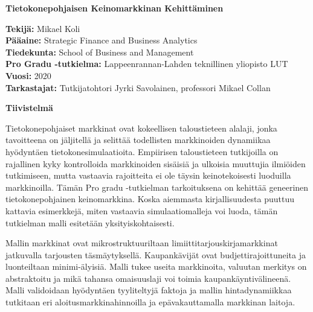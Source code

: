 

\thispagestyle{plain}
\begin{center}
    \Large
    \textbf{Tietokonepohjaisen Keinomarkkinan Kehitt\"aminen}
        
    \vspace{0.4cm}
        
    \vspace{0.4cm}
    \begin{flushleft}
        \normalsize
        \textbf{Tekijä:} Mikael Koli \\
        \textbf{Pääaine:} Strategic Finance and Business Analytics \\
        \textbf{Tiedekunta:} School of Business and Management \\
        \textbf{Pro Gradu -tutkielma:} Lappeenrannan-Lahden teknillinen yliopisto LUT \\
        \textbf{Vuosi:} 2020 \\
        \textbf{Tarkastajat:} Tutkijatohtori Jyrki Savolainen, professori Mikael Collan
    \end{flushleft}
       
    \vspace{0.5cm}
    \textbf{Tiivistelmä}
\end{center}

Tietokonepohjaiset markkinat ovat kokeellisen taloustieteen alalaji, jonka tavoitteena
on jäljitellä ja selittää todellisten markkinoiden dynamiikaa hyödyntäen
tietokonesimulaatioita. Empiirisen taloustieteen tutkijoilla on rajallinen kyky kontrolloida
markkinoiden sisäisiä ja ulkoisia muuttujia ilmiöiden tutkimiseen, mutta vastaavia rajoitteita
ei ole täysin keinotekoisesti luoduilla markkinoilla. Tämän Pro gradu -tutkielman tarkoituksena on 
kehittää geneerinen tietokonepohjainen keinomarkkina. Koska aiemmasta kirjallisuudesta puuttuu 
kattavia esimerkkejä, miten vastaavia simulaatiomalleja voi luoda, tämän tutkielman malli esitetään
yksityiskohtaisesti.


Mallin markkinat ovat mikrostruktuuriltaan limiittitarjouskirjamarkkinat jatkuvalla tarjousten täsmäytyksellä.
Kaupankävijät ovat budjettirajoittuneita ja luonteiltaan minimi-älyisiä. Malli tukee useita markkinoita, 
valuutan merkitys on abstraktoitu ja mikä tahansa omaisuuslaji voi toimia kaupankäyntivälineenä. 
Malli validoidaan hyödyntäen tyyliteltyjä faktoja ja mallin hintadynamiikkaa
tutkitaan eri aloitusmarkkinahinnoilla ja epävakauttamalla markkinan laitoja.

